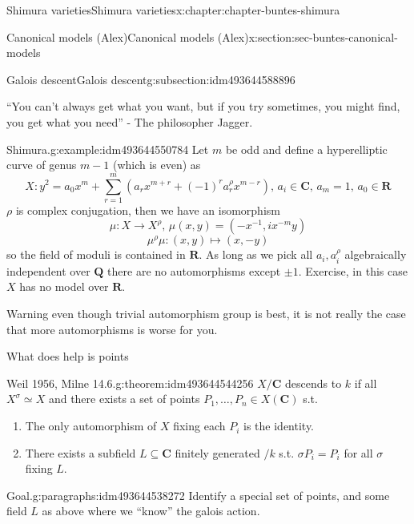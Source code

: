 \documentclass[oneside,10pt,]{book}
\numberwithin{equation}{section}
\newcommand{\inv}{^{-1}}
\newcommand{\QQ}{\mathbf{Q}}
\newcommand{\RR}{\mathbf{R}}
\newcommand{\CC}{\mathbf{C}}
\begin{document}
\begin{chapterptx}{Shimura varieties}{}{Shimura varieties}{}{}{x:chapter:chapter-buntes-shimura}
\begin{sectionptx}{Canonical models (Alex)}{}{Canonical models (Alex)}{}{}{x:section:sec-buntes-canonical-models}
\begin{subsectionptx}{Galois descent}{}{Galois descent}{}{}{g:subsection:idm493644588896}
\par
``You can't always get what you want, but if you try sometimes, you might find, you get what you need'' - The philosopher Jagger.%
\begin{example}{Shimura.}{g:example:idm493644550784}%
Let \(m\) be odd and define a hyperelliptic curve of genus \(m - 1\) (which is even) as%
\begin{equation*}
X\colon y^2 = a_0 x^m + \sum_{r= 1}^m (a_r x^{m+r} + (-1)^r a_r^\rho x^{m-r}),\,a_i \in \CC,\,a_m = 1,\,a_0 \in \RR
\end{equation*}
\(\rho\) is complex conjugation, then we have an isomorphism%
\begin{equation*}
\mu\colon X \to X^\rho,\,\mu(x,y) = (-x\inv, i x^{-m} y)
\end{equation*}
%
\begin{equation*}
\mu^\rho \mu \colon (x,y)\mapsto (x,-y)
\end{equation*}
so the field of moduli is contained in \(\RR\). As long as we pick all \(a_i,a_i^\rho\) algebraically independent over \(\QQ\) there are no automorphisms except \(\pm 1\). Exercise, in this case \(X\) has no model over \(\RR\).%
\end{example}
Warning even though trivial automorphism group is best, it is not really the case that more automorphisms is worse for you.%
\par
What does help is points%
\begin{theorem}{Weil 1956, Milne 14.6.}{}{g:theorem:idm493644544256}%
\(X/\CC\) descends to \(k\) if all \(X^\sigma \simeq X\) and there exists a set of points \(P_1,\ldots, P_n\in  X(\CC)\) s.t.%
\begin{enumerate}
\item{}The only automorphism of \(X\) fixing each \(P_i\) is the identity.%
\item{}There exists a subfield \(L \subseteq \CC\) finitely generated \(/k\) s.t. \(\sigma P_i = P_i\) for all \(\sigma\) fixing \(L\).%
\end{enumerate}
%
\end{theorem}
\begin{paragraphs}{Goal.}{g:paragraphs:idm493644538272}%
Identify a special set of points, and some field \(L\) as above where we ``know'' the galois action.%
\end{paragraphs}%
\end{subsectionptx}
%
%
\typeout{************************************************}
\typeout{************************************************}

\end{sectionptx}
\end{chapterptx}
\end{document}
